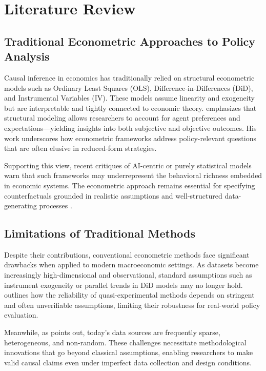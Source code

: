 \section{Literature Review}\label{sec:litreview}

\subsection{Traditional Econometric Approaches to Policy Analysis}\label{subsec:econometric}

Causal inference in economics has traditionally relied on structural econometric models such as Ordinary Least Squares (OLS), Difference-in-Differences (DiD), and Instrumental Variables (IV). These models assume linearity and exogeneity but are interpretable and tightly connected to economic theory. \citet{heckman2008econometric} emphasizes that structural modeling allows researchers to account for agent preferences and expectations—yielding insights into both subjective and objective outcomes. His work underscores how econometric frameworks address policy-relevant questions that are often elusive in reduced-form strategies.

Supporting this view, recent critiques of AI-centric or purely statistical models warn that such frameworks may underrepresent the behavioral richness embedded in economic systems. The econometric approach remains essential for specifying counterfactuals grounded in realistic assumptions and well-structured data-generating processes \citep{econmodel2023}.

\subsection{Limitations of Traditional Methods}\label{subsec:limitations}

Despite their contributions, conventional econometric methods face significant drawbacks when applied to modern macroeconomic settings. As datasets become increasingly high-dimensional and observational, standard assumptions such as instrument exogeneity or parallel trends in DiD models may no longer hold. \citet{policy2020hal} outlines how the reliability of quasi-experimental methods depends on stringent and often unverifiable assumptions, limiting their robustness for real-world policy evaluation.

Meanwhile, as \citet{bareinboim2023fusion} points out, today's data sources are frequently sparse, heterogeneous, and non-random. These challenges necessitate methodological innovations that go beyond classical assumptions, enabling researchers to make valid causal claims even under imperfect data collection and design conditions.

